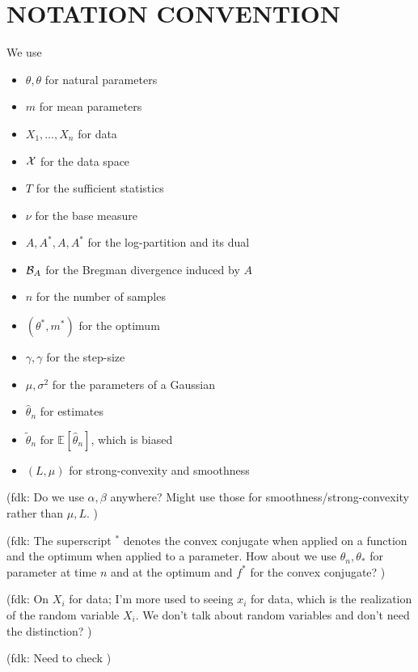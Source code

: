 \documentclass[twoside]{article}
\let\oldsection\section
\renewcommand{\section}[1]{\oldsection{\texorpdfstring{\uppercase{#1}}{#1}}}
\newcommand{\fdk}[1]{\textcolor{Periwinkle}{(fdk:#1)}}
\newcommand*{\expect}[2][]{\ensuremath{\mathbb{E}_{#1} \left[ #2 \right] }} %
\newcommand{\logpart}{A}
\newcommand{\conj}{\logpart^*}
\newcommand{\nat}{\theta}
\newcommand{\m}{m}
\newcommand{\lr}{\gamma} %
\begin{document}
\section{Notation convention}
We use
\begin{itemize}
	\item $\theta, \nat$ for natural parameters
	\item $\m$ for mean parameters
	\item $X_1,\ldots,X_n$ for data
	\item ${\mathcal X}$ for the data space
	\item $T$ for the sufficient statistics
	\item $\nu$ for the base measure
	\item $A, A^*, \logpart, \conj$ for the log-partition and its dual
	\item ${\mathcal B}_A$ for the Bregman divergence induced by $A$
	\item $n$ for the number of samples
	\item $(\theta^*,m^*)$ for the optimum
	\item $\gamma, \lr$ for the step-size
	\item $\mu,\sigma^2$ for the parameters of a Gaussian
	\item $\hat\theta_n$ for estimates
	\item $\tilde\theta_n$ for $\expect{\hat\theta_n}$, which is biased
	\item $(L, \mu)$ for strong-convexity and smoothness
\end{itemize}

\fdk{
	Do we use $\alpha, \beta$ anywhere?
	Might use those for smoothness/strong-convexity rather than $\mu, L$.
}

\fdk{
	The superscript ${}^*$ denotes the convex conjugate when applied on a function
	and the optimum when applied to a parameter.
	How about we use $\theta_n, \theta_*$ for parameter at time $n$ and at the optimum
	and $f^*$ for the convex conjugate?
}

\fdk{
	On $X_i$ for data; I'm more used to seeing $x_i$ for data, which is the realization of the random variable $X_i$.
	We don't talk about random variables and don't need the distinction?
}

\fdk{
	Need to check
}
\end{document}
